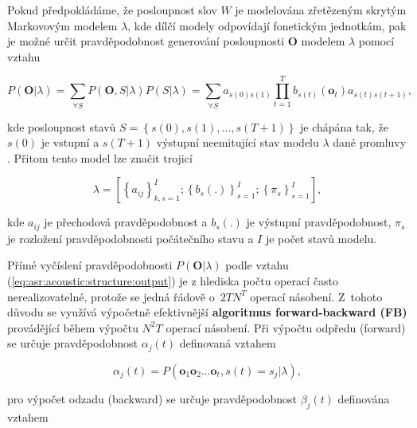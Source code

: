 Pokud předpokládáme, že posloupnost slov $W$ je modelována zřetězeným skrytým Markovovým modelem $\lambda$, kde dílčí modely odpovídají fonetickým jednotkám, pak je možné určit pravděpodobnost generování posloupnosti $\boldsymbol{O}$ modelem $\lambda$ pomocí vztahu

\begin{equation}
  P\left(\boldsymbol{O}|\lambda\right) = \sum_{\forall S} P\left(\boldsymbol{O}, S| \lambda\right)P\left(S|\lambda\right) = \sum_{\forall S} a_{s\left(0\right)s\left(1\right)} \prod_{t=1}^{T} b_{s\left(t\right)}\left(\boldsymbol{o}_t\right)a_{s\left(t\right)s\left(t+1\right)},
  \label{eq:asr:acoustic:structure:output}
\end{equation}

\noindent kde posloupnost stavů $S = \left\{s\left(0\right), s\left(1\right),\dots, s\left(T+1\right)\right\}$ je chápána tak, že $s\left(0\right)$ je vstupní a $s\left(T+1\right)$ výstupní neemitující stav modelu $\lambda$ dané promluvy \cite{Psutka2006}. Přitom tento model lze značit trojicí

\begin{equation}
  \lambda = \left[\left\{a_{ij}\right\}_{k,s=1}^{I}; \left\{b_s(.)\right\}_{s=1}^{I};\left\{\pi_{s}\right\}_{s=1}^{I}\right],
  \label{eq:asr:acoustic:structure:marking}
\end{equation}

\noindent kde $a_{ij}$ je přechodová pravděpodobnost a $b_s(.)$ je výstupní pravděpodobnost, $\pi_s$ je rozložení pravděpodobnosti počátečního stavu a $I$ je počet stavů modelu.

Přímé vyčíslení pravděpodobnosti $P\left(\boldsymbol{O}|\lambda\right)$ podle vztahu (\ref{eq:asr:acoustic:structure:output}) je z hlediska počtu operací často nerealizovatelné, protože se jedná řádově o~$2TN^{T}$ operací násobení. Z~tohoto důvodu se využívá výpočetně efektivnější \textbf{algoritmus forward-backward (FB)} provádějící během výpočtu $N^{2}T$ operací násobení. Při výpočtu odpředu (forward) se určuje pravděpodobnost $\alpha_j\left(t\right)$ definovaná vztahem

\begin{equation}
  \alpha_{j}\left(t\right) = P\left(\boldsymbol{o}_1\boldsymbol{o}_2\dots \boldsymbol{o}_t, s\left(t\right)=s_j|\lambda\right),
  \label{eq:asr:acoustic:structure:forward}
\end{equation}

\noindent pro výpočet odzadu (backward) se určuje pravděpodobnost $\beta_j\left(t\right)$ definována vztahem


